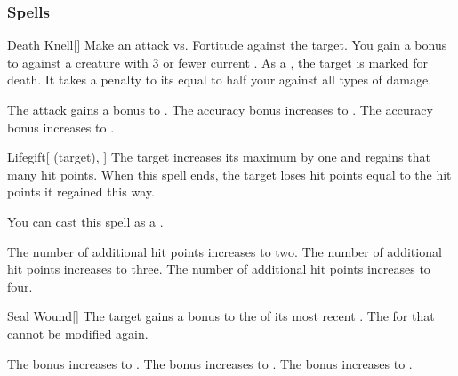 \subsubsection{Spells}


\lowercase{\hypertarget{spell:Death Knell}{}}\label{spell:Death Knell}
\begin{freeability}[Rank 1]{\hypertarget{spell:Death Knell}{Death Knell}}[]
Make an attack vs. Fortitude against the target.
You gain a  bonus to  against a creature with 3 or fewer current .
\hit As a , the target is marked for death.
It takes a penalty to its  equal to half your  against all types of damage.

\rankline
{} The attack gains a  bonus to .
 The accuracy bonus increases to .
 The accuracy bonus increases to .
\end{freeability}
\vspace{0.25em}



\lowercase{\hypertarget{spell:Lifegift}{}}\label{spell:Lifegift}
\begin{attuneability}[Rank 1]{\hypertarget{spell:Lifegift}{Lifegift}}[ (target), ]
The target increases its maximum  by one and regains that many hit points.
When this spell ends, the target loses hit points equal to the hit points it regained this way.

You can cast this spell as a .

\rankline
{} The number of additional hit points increases to two.
 The number of additional hit points increases to three.
 The number of additional hit points increases to four.
\end{attuneability}
\vspace{0.25em}



\lowercase{\hypertarget{spell:Seal Wound}{}}\label{spell:Seal Wound}
\begin{freeability}[Rank 1]{\hypertarget{spell:Seal Wound}{Seal Wound}}[]
The target gains a  bonus to the  of its most recent .
The  for that  cannot be modified again.

\rankline
{} The bonus increases to .
 The bonus increases to .
 The bonus increases to .
\end{freeability}
\vspace{0.25em}



